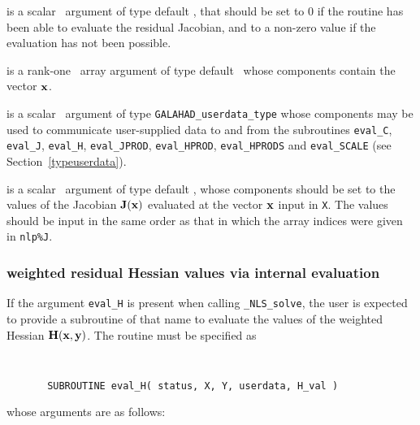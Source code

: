 \documentclass{galahad}
\newcommand{\packagename}{NLS}
\newcommand{\fullpackagename}{\libraryname\_\packagename}
\newcommand{\solver}{{\tt \fullpackagename\_solve}}
\begin{document}
\begin{description}
 is a scalar \intentout\ argument of type default \integer,
that should be set to 0 if the routine has been able to evaluate
the residual Jacobian,
and to a non-zero value if the evaluation has not been possible.

 is a rank-one \intentin\ array argument of type default \realdp\
whose components contain the vector ${\mathbf{x}}$.

 is a scalar \intentinout\ argument of type
{\tt GALAHAD\_userdata\_type} whose components may be used
to communicate user-supplied data to and from the subroutines
{\tt eval\_C}, {\tt eval\_J}, {\tt eval\_H}, {\tt eval\_JPROD},
{\tt eval\_HPROD}, {\tt eval\_HPRODS} and {\tt eval\_SCALE}
(see Section~\ref{typeuserdata}).

 is a scalar \intentout\ argument of type default \realdp,
whose components should be set to the values
of the Jacobian ${\mathbf{J}}({\mathbf{x}})$
evaluated at the vector ${\mathbf{x}}$ input in {\tt X}.
The values should
be input in the same order as that in which the array indices were
given in {\tt nlp\%J}.

\end{description}


\subsubsection{weighted residual Hessian values via internal evaluation\label{hfv}}

If the argument {\tt eval\_H} is present when calling \solver, the
user is expected to provide a subroutine of that name to evaluate the
values of the weighted Hessian ${\mathbf{H}}({\mathbf{x}},{\mathbf{y}})$.
The routine must be specified as

\def\baselinestretch{0.8}
{\tt
\begin{verbatim}
       SUBROUTINE eval_H( status, X, Y, userdata, H_val )
\end{verbatim} }
\def\baselinestretch{1.0}
\noindent whose arguments are as follows:
\end{document}
